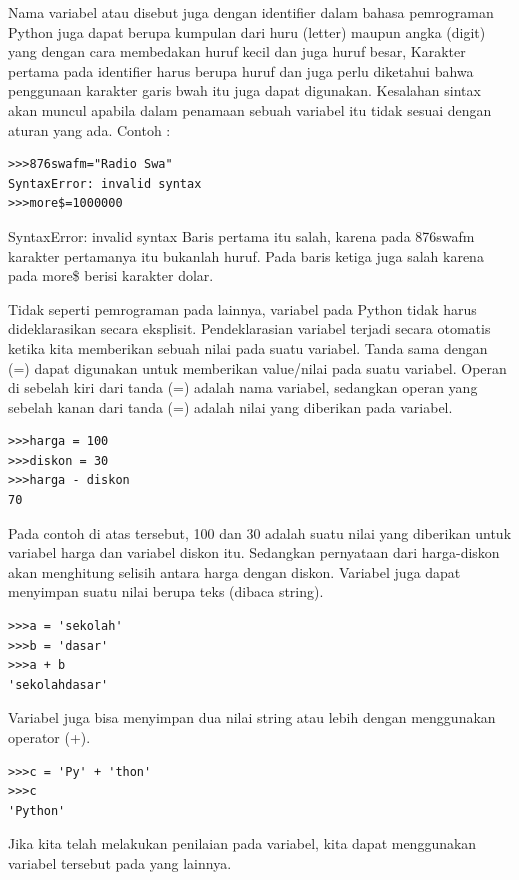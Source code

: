 Nama variabel atau disebut juga dengan identifier dalam bahasa pemrograman Python juga dapat berupa kumpulan dari huru (letter) maupun angka (digit) yang dengan cara membedakan huruf kecil dan juga huruf besar, Karakter pertama pada identifier harus berupa huruf dan juga perlu diketahui bahwa penggunaan karakter garis bwah itu juga dapat digunakan.
Kesalahan sintax akan muncul apabila dalam penamaan sebuah variabel itu tidak sesuai dengan aturan yang ada.
Contoh :
\begin{verbatim}
>>>876swafm="Radio Swa"
SyntaxError: invalid syntax
>>>more$=1000000
\end{verbatim}
SyntaxError: invalid syntax
Baris pertama itu salah, karena pada 876swafm karakter pertamanya itu bukanlah huruf. Pada baris ketiga juga salah karena pada more\$ berisi karakter dolar.

Tidak seperti pemrograman pada lainnya, variabel pada Python tidak harus dideklarasikan secara eksplisit. Pendeklarasian variabel terjadi secara otomatis ketika kita memberikan sebuah nilai pada suatu variabel. Tanda sama dengan (=) dapat digunakan untuk memberikan value/nilai pada suatu variabel. Operan di sebelah kiri dari tanda (=) adalah nama variabel, sedangkan operan yang sebelah kanan dari tanda (=) adalah nilai yang diberikan pada variabel.\cite{utamipemrograman}

\begin{verbatim}
>>>harga = 100
>>>diskon = 30
>>>harga - diskon
70
\end{verbatim}

Pada contoh di atas tersebut, 100 dan 30 adalah suatu nilai yang diberikan untuk variabel harga dan variabel diskon itu. Sedangkan pernyataan dari harga-diskon akan menghitung selisih antara harga dengan diskon. Variabel juga dapat menyimpan suatu nilai berupa teks (dibaca string).

\begin{verbatim}
>>>a = 'sekolah'
>>>b = 'dasar'
>>>a + b
'sekolahdasar'
\end{verbatim}

Variabel juga bisa menyimpan dua nilai string atau lebih dengan menggunakan operator (+).

\begin{verbatim}
>>>c = 'Py' + 'thon'
>>>c
'Python'
\end{verbatim}

Jika kita telah melakukan penilaian pada variabel, kita dapat menggunakan variabel tersebut pada yang lainnya.

